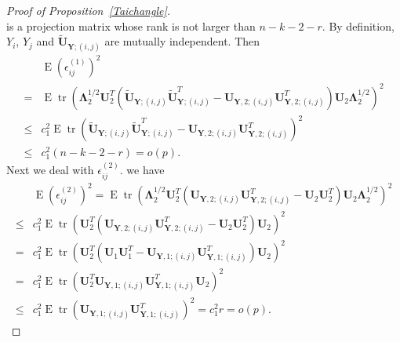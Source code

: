 \documentclass[12pt]{article} %
\DeclareMathOperator{\mytr}{tr}
\DeclareMathOperator{\myE}{E}
\newcommand{\bY}{\mathbf{Y}}
\newcommand{\bU}{\mathbf{U}}
\newcommand{\bfsym}[1]{\ensuremath{\boldsymbol{#1}}}
\def\bLambda {\bfsym {\Lambda}}
\theoremstyle{definition}
\begin{document}
\begin{appendices}
\begin{proof}[Proof of Proposition~\ref{Taichangle}]
$$        $$
        is a projection matrix whose rank is not larger than $n-k-2-r$.
        By definition, $Y_i$, $Y_j$ and $\tilde{\bU}_{\bY;(i,j)}$ are mutually independent.
        Then
        $$
        \begin{aligned}
            &\myE (\epsilon_{ij}^{(1)})^2\\
            =&\myE \mytr (\bLambda_2^{1/2}\bU_2^T(\tilde{\bU}_{\bY;(i,j)} \tilde{\bU}_{\bY;(i,j)}^T-\bU_{\bY,2;(i,j)} \bU_{\bY,2;(i,j)}^T)\bU_2 \bLambda_2^{1/2})^2\\
            \leq & c_1^2\myE \mytr (\tilde{\bU}_{\bY;(i,j)} \tilde{\bU}_{\bY;(i,j)}^T-\bU_{\bY,2;(i,j)} \bU_{\bY,2;(i,j)}^T)^2\\
            \leq & c_1^2 (n-k-2-r)=o(p).
        \end{aligned}
        $$
        Next we deal with $\epsilon_{ij}^{(2)}$. we have
        $$
        \begin{aligned}
            &\myE (\epsilon_{ij}^{(2)})^2
            =\myE \mytr (\bLambda_2^{1/2}\bU_2^T(
            \bU_{\bY,2;(i,j)} \bU_{\bY,2;(i,j)}^T-\bU_2\bU_2^T
            )\bU_2 \bLambda_2^{1/2})^2\\
            \leq & c_1^2 
            \myE \mytr (\bU_2^T(
            \bU_{\bY,2;(i,j)} \bU_{\bY,2;(i,j)}^T-\bU_2\bU_2^T
            )\bU_2 )^2\\
            = & c_1^2 
            \myE \mytr (\bU_2^T(
            \bU_1\bU_1^T-
\bU_{\bY,1;(i,j)} \bU_{\bY,1;(i,j)}^T
            )\bU_2 )^2\\
            = & c_1^2 
            \myE \mytr (\bU_2^T\bU_{\bY,1;(i,j)} \bU_{\bY,1;(i,j)}^T\bU_2 )^2\\
            \leq  & c_1^2 
            \myE \mytr (\bU_{\bY,1;(i,j)} \bU_{\bY,1;(i,j)}^T)^2
            =c_1^2 r=o(p).
        \end{aligned}
        $$


\end{proof}
\end{appendices}
\end{document}
